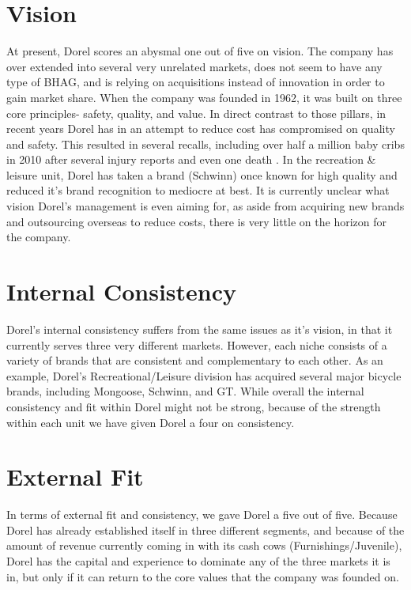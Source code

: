 \section{Vision}
At present, Dorel scores an abysmal one out of five on vision.  The company has over extended into several very unrelated markets, does not seem to have any type of BHAG, and is relying on acquisitions instead of innovation in order to gain market share.  When the company was founded in 1962, it was built on three core principles- safety, quality, and value.  In direct contrast to those pillars, in recent years Dorel has in an attempt to reduce cost has compromised on quality and safety. This resulted in several recalls, including over half a million baby cribs in 2010 after several injury reports and even one death \cite{cpsc}.  In the recreation \& leisure unit, Dorel has taken a brand (Schwinn) once known for high quality and reduced it’s brand recognition to mediocre at best.  It is currently unclear what vision Dorel’s management is even aiming for, as aside from acquiring new brands and outsourcing overseas to reduce costs, there is very little on the horizon for the company.  

\section{Internal Consistency}
Dorel’s internal consistency suffers from the same issues as it’s vision, in that it currently serves three very different markets.  However, each niche consists of a variety of brands that are consistent and complementary to each other.  As an example, Dorel’s Recreational/Leisure division has acquired several major bicycle brands, including Mongoose, Schwinn, and GT.  While overall the internal consistency and fit within Dorel might not be strong, because of the strength within each unit we have given Dorel a four on consistency.

\section{External Fit}
In terms of  external fit and consistency, we gave Dorel a five out of five.  Because Dorel has already established itself in three different segments, and because of the amount of revenue currently coming in with its cash cows (Furnishings/Juvenile), Dorel has the capital and experience to dominate any of the three markets it is in, but only if it can return to the core values that the company was founded on.

